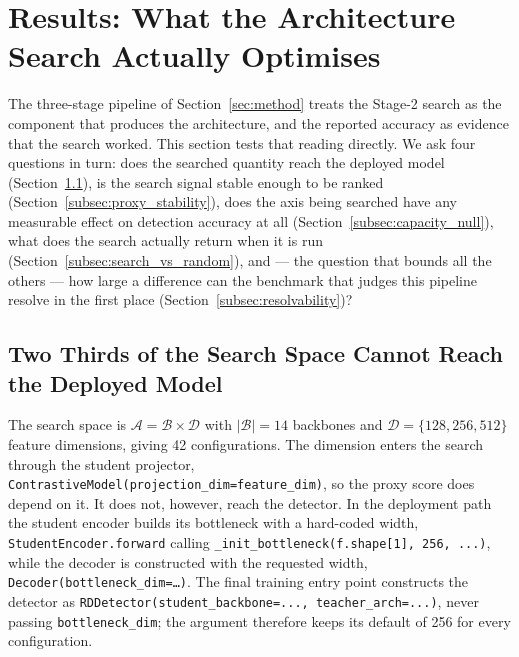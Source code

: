 
\section{Results: What the Architecture Search Actually Optimises}
\label{sec:diagnosis}

The three-stage pipeline of Section~\ref{sec:method} treats the Stage-2 search as
the component that produces the architecture, and the reported accuracy as
evidence that the search worked. This section tests that reading directly. We ask
four questions in turn: does the searched quantity reach the deployed model
(Section~\ref{subsec:inert}), is the search signal stable enough to be ranked
(Section~\ref{subsec:proxy_stability}), does the axis being searched have any
measurable effect on detection accuracy at all (Section~\ref{subsec:capacity_null}),
what does the search actually return when it is run
(Section~\ref{subsec:search_vs_random}), and --- the question that bounds all the
others --- how large a difference can the benchmark that judges this pipeline
resolve in the first place (Section~\ref{subsec:resolvability})?

\subsection{Two Thirds of the Search Space Cannot Reach the Deployed Model}
\label{subsec:inert}

The search space is
$\mathcal{A} = \mathcal{B} \times \mathcal{D}$ with
$|\mathcal{B}| = 14$ backbones and
$\mathcal{D} = \{128, 256, 512\}$ feature dimensions, giving 42 configurations.
The dimension enters the search through the student projector,
\texttt{ContrastiveModel(\allowbreak projection\_dim=\allowbreak feature\_dim)}, so the proxy score does
depend on it. It does not, however, reach the detector. In the deployment path the
student encoder builds its bottleneck with a hard-coded width,
\texttt{StudentEncoder.forward} calling
\texttt{\_init\_bottleneck(f.shape[1], 256, ...)}, while the decoder is
constructed with the requested width, \texttt{Decoder(bottleneck\_dim=\dots)}. The
final training entry point constructs the detector as
\texttt{RDDetector(student\_backbone=..., teacher\_arch=...)}, never passing
\texttt{bottleneck\_dim}; the argument therefore keeps its default of 256 for
every configuration.

